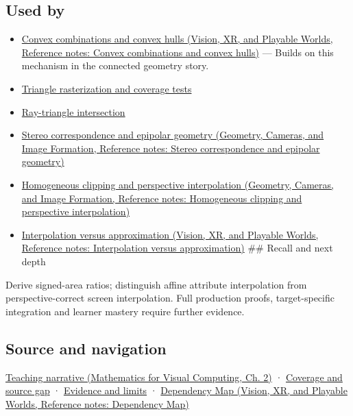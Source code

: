 \subsection{Used by}\label{appendix-02b9d9a81dca-used-by}

\begin{itemize}
\item
  \href{../07-Vision-XR-and-Playable-Worlds/main.pdf\#nameddest=appendix-0026ec42c9d5}{Convex combinations and convex hulls (Vision, XR, and Playable Worlds, Reference notes: Convex combinations and convex hulls)} --- Builds on this mechanism in the connected geometry story.
\item
  \hyperref[appendix-ed3f9bc298fe]{Triangle rasterization and coverage tests}
\item
  \hyperref[appendix-47ac1bd6d144]{Ray-triangle intersection}
\item
  \href{../03-Geometry-Cameras-and-Image-Formation/main.pdf\#nameddest=appendix-c4e98b6e4001}{Stereo correspondence and epipolar geometry (Geometry, Cameras, and Image Formation, Reference notes: Stereo correspondence and epipolar geometry)}
\item
  \href{../03-Geometry-Cameras-and-Image-Formation/main.pdf\#nameddest=appendix-40426e4b2103}{Homogeneous clipping and perspective interpolation (Geometry, Cameras, and Image Formation, Reference notes: Homogeneous clipping and perspective interpolation)}
\item
  \href{../07-Vision-XR-and-Playable-Worlds/main.pdf\#nameddest=appendix-0c2a5f69851e}{Interpolation versus approximation (Vision, XR, and Playable Worlds, Reference notes: Interpolation versus approximation)} \#\# Recall and next depth
\end{itemize}

Derive signed-area ratios; distinguish affine attribute interpolation from perspective-correct screen interpolation. Full production proofs, target-specific integration and learner mastery require further evidence.

\subsection{Source and navigation}\label{appendix-02b9d9a81dca-source-and-navigation}

\href{../02-Mathematics-for-Visual-Computing/main.pdf\#nameddest=01-foundations-i-ch018-the-sensor-needs-coordinates-inside-the-triangle}{Teaching narrative (Mathematics for Visual Computing, Ch. 2)} · \hyperref[appendix-fd090d982a15-phase-6---parts-501-600]{Coverage and source gap} · \hyperref[appendix-a103e7846d21-phase-6---source-analysis-and-verification]{Evidence and limits} · \href{../07-Vision-XR-and-Playable-Worlds/main.pdf\#nameddest=appendix-4ad47bdd269a}{Dependency Map (Vision, XR, and Playable Worlds, Reference notes: Dependency Map)}

